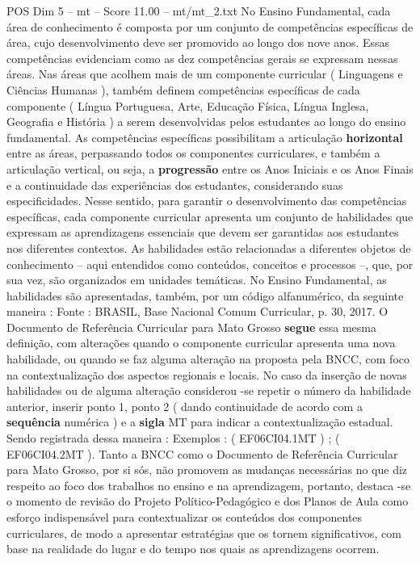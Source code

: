 \begin{textsample}{POS Dim 5 – mt – Score 11.00 – mt/mt\_2.txt}
No Ensino Fundamental, cada área de conhecimento é composta por um conjunto de competências específicas de área, cujo desenvolvimento deve ser promovido ao longo dos nove anos.
Essas competências evidenciam como as dez competências gerais se expressam nessas áreas.
Nas áreas que acolhem mais de um componente curricular ( Linguagens e Ciências Humanas ), também definem competências específicas de cada componente ( Língua Portuguesa, Arte, Educação Física, Língua Inglesa, Geografia e História ) a serem desenvolvidas pelos estudantes ao longo do ensino fundamental.
As competências específicas possibilitam a articulação \textbf{horizontal} entre as áreas, perpassando todos os componentes curriculares, e também a articulação vertical, ou seja, a \textbf{progressão} entre os Anos Iniciais e os Anos Finais e a continuidade das experiências dos estudantes, considerando suas especificidades.
Nesse sentido, para garantir o desenvolvimento das competências específicas, cada componente curricular apresenta um conjunto de habilidades que expressam as aprendizagens essenciais que devem ser garantidas aos estudantes nos diferentes contextos.
As habilidades estão relacionadas a diferentes objetos de conhecimento – aqui entendidos como conteúdos, conceitos e processos –, que, por sua vez, são organizados em unidades temáticas.
No Ensino Fundamental, as habilidades são apresentadas, também, por um código alfanumérico, da seguinte maneira : Fonte : BRASIL, Base Nacional Comum Curricular, p. 30, 2017.
O Documento de Referência Curricular para Mato Grosso \textbf{segue} essa mesma definição, com alterações quando o componente curricular apresenta uma nova habilidade, ou quando se faz alguma alteração na proposta pela BNCC, com foco na contextualização dos aspectos regionais e locais.
No caso da inserção de novas habilidades ou de alguma alteração considerou -se repetir o número da habilidade anterior, inserir ponto 1, ponto 2 ( dando continuidade de acordo com a \textbf{sequência} numérica ) e a \textbf{sigla} MT para indicar a contextualização estadual.
Sendo registrada dessa maneira : Exemplos : ( EF06CI04.1MT ) ; ( EF06CI04.2MT ).
Tanto a BNCC como o Documento de Referência Curricular para Mato Grosso, por si sós, não promovem as mudanças necessárias no que diz respeito ao foco dos trabalhos no ensino e na aprendizagem, portanto, destaca -se o momento de revisão do Projeto Político-Pedagógico e dos Planos de Aula como esforço indispensável para contextualizar os conteúdos dos componentes curriculares, de modo a apresentar estratégias que os tornem significativos, com base na realidade do lugar e do tempo nos quais as aprendizagens ocorrem.

\end{textsample}
